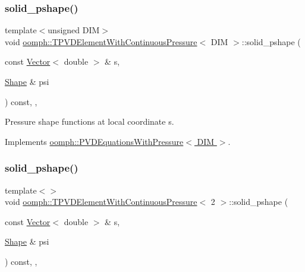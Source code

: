\subsubsection{\texorpdfstring{solid\+\_\+pshape()}{solid\_pshape()}\hspace{0.1cm}{\footnotesize\ttfamily [1/3]}}
{\footnotesize\ttfamily template$<$unsigned D\+IM$>$ \\
void \hyperlink{classoomph_1_1TPVDElementWithContinuousPressure}{oomph\+::\+T\+P\+V\+D\+Element\+With\+Continuous\+Pressure}$<$ D\+IM $>$\+::solid\+\_\+pshape (\begin{DoxyParamCaption}\item[{const \hyperlink{classoomph_1_1Vector}{Vector}$<$ double $>$ \&}]{s,  }\item[{\hyperlink{classoomph_1_1Shape}{Shape} \&}]{psi }\end{DoxyParamCaption}) const\hspace{0.3cm}{\ttfamily [inline]}, {\ttfamily [protected]}, {\ttfamily [virtual]}}



Pressure shape functions at local coordinate s. 



Implements \hyperlink{classoomph_1_1PVDEquationsWithPressure_ad580f7919412f6b574b76f514f56282c}{oomph\+::\+P\+V\+D\+Equations\+With\+Pressure$<$ D\+I\+M $>$}.

\mbox{\label{classoomph_1_1TPVDElementWithContinuousPressure_a04b5d07460826872be4ca42caf9d9c95}} 
\subsubsection{\texorpdfstring{solid\+\_\+pshape()}{solid\_pshape()}\hspace{0.1cm}{\footnotesize\ttfamily [2/3]}}
{\footnotesize\ttfamily template$<$$>$ \\
void \hyperlink{classoomph_1_1TPVDElementWithContinuousPressure}{oomph\+::\+T\+P\+V\+D\+Element\+With\+Continuous\+Pressure}$<$ 2 $>$\+::solid\+\_\+pshape (\begin{DoxyParamCaption}\item[{const \hyperlink{classoomph_1_1Vector}{Vector}$<$ double $>$ \&}]{s,  }\item[{\hyperlink{classoomph_1_1Shape}{Shape} \&}]{psi }\end{DoxyParamCaption}) const\hspace{0.3cm}{\ttfamily [inline]}, {\ttfamily [protected]}, {\ttfamily [virtual]}}


